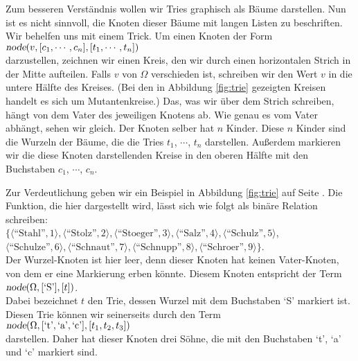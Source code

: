 Zum besseren Verst\"andnis wollen wir Tries graphisch als B\"aume darstellen.
Nun ist es nicht sinnvoll, die Knoten dieser B\"aume mit langen Listen zu beschriften.
Wir behelfen uns mit einem Trick.  Um einen Knoten der Form \\[0.2cm]
\hspace*{1.3cm} 
$\textsl{node}(v, [c_1, \cdots, c_n], [t_1, \cdots, t_n])$ \\[0.2cm]
darzustellen, zeichnen wir einen Kreis,
den wir durch einen horizontalen Strich in der Mitte aufteilen.
Falls $v$ von $\Omega$ verschieden ist, schreiben wir den Wert $v$ in die untere H\"alfte
des Kreises.
(Bei den in Abbildung \ref{fig:trie} gezeigten Kreisen handelt es sich um
Mutantenkreise.)
Das, was wir \"uber dem Strich schreiben,
h\"angt von dem Vater des jeweiligen Knotens ab.  Wie genau es vom Vater abh\"angt, sehen wir gleich.
Der Knoten selber hat $n$ Kinder. Diese $n$ Kinder sind die 
Wurzeln der B\"aume, die die Tries $t_1$, $\cdots$, $t_n$ darstellen.
Au{\ss}erdem markieren wir die diese Knoten darstellenden Kreise in den oberen H\"alfte 
mit den Buchstaben $c_1$, $\cdots$, $c_n$.  


Zur Verdeutlichung geben wir ein Beispiel in 
Abbildung \ref{fig:trie} auf Seite \pageref{fig:trie}.
Die Funktion, die hier dargestellt wird, l\"asst sich wie folgt als bin\"are Relation
schreiben: \\[0.2cm]
\hspace*{1.3cm} $ \bigl\{ \langle \textrm{``Stahl''},   1  \rangle, \langle \textrm{``Stolz''},     2  \rangle, \langle \textrm{``Stoeger''},   3  \rangle, 
             \langle \textrm{``Salz''},      4  \rangle, \langle \textrm{``Schulz''},    5  \rangle$, \\[0.2cm]
\hspace*{1.5cm} $\langle \textrm{``Schulze''},   6  \rangle, \langle \textrm{``Schnaut''},   7  \rangle, 
  \langle \textrm{``Schnupp''},   8  \rangle, 
  \langle \textrm{``Schroer''},   9  \rangle\}$. \\[0.2cm]
Der Wurzel-Knoten ist hier leer, denn dieser Knoten hat keinen Vater-Knoten, von dem er
eine Markierung erben k\"onnte.  Diesem Knoten entspricht der Term \\[0.2cm]
\hspace*{1.3cm} $\textsl{node}(\Omega,[\textrm{`S'}], [t])$. \\[0.2cm]
Dabei bezeichnet $t$ den Trie, dessen Wurzel mit dem Buchstaben `S' markiert ist.
Diesen Trie k\"onnen wir seinerseits durch den Term \\[0.2cm]
\hspace*{1.3cm} 
$\textsl{node}(\Omega,[\textrm{`t'},\textrm{`a'},\textrm{`c'}], [t_1, t_2, t_3])$ \\[0.2cm]
darstellen.  Daher hat dieser Knoten drei S\"ohne, die mit den Buchstaben `t', `a' und `c'
markiert sind.

